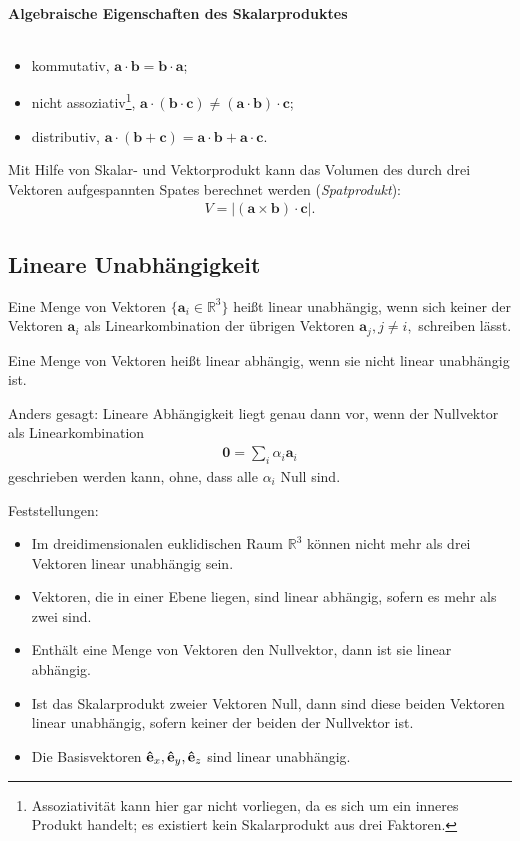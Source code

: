 \paragraph{Algebraische Eigenschaften des Skalarproduktes}$~$

\begin{itemize}
    \item kommutativ, $\bm{a}\cdot \bm{b} = \bm{b}\cdot\bm{a}$; 
    \item nicht assoziativ\footnote{Assoziativität kann hier gar nicht vorliegen, da es sich um ein inneres Produkt handelt; es existiert kein Skalarprodukt aus drei Faktoren.}, $\bm{a}\cdot (\bm{b}\cdot\bm{c}) \neq (\bm{a}\cdot\bm{b})\cdot\bm{c}$;
    \item distributiv, $\bm{a}\cdot (\bm{b}+\bm{c}) = \bm{a}\cdot\bm{b}+\bm{a}\cdot\bm{c}$.
\end{itemize}
Mit Hilfe von Skalar- und Vektorprodukt kann das Volumen des durch drei Vektoren aufgespannten Spates berechnet werden (\emph{Spatprodukt}): 
\begin{align}
    V = |(\bm{a}\times\bm{b}) \cdot\bm{c}|.
\end{align}

\subsection{Lineare Unabhängigkeit}
Eine Menge von Vektoren $\{\bm{a}_i \in \mathbb{R}^3\}$ heißt linear unabhängig, wenn sich keiner der Vektoren $\bm{a}_i$ als Linearkombination der übrigen Vektoren $\bm{a}_j, j \neq i,$ schreiben lässt. 

Eine Menge von Vektoren heißt linear abhängig, wenn sie nicht linear unabhängig ist. 

Anders gesagt: Lineare Abhängigkeit liegt genau dann vor, wenn der Nullvektor als Linearkombination 
\begin{align}
    \bm{0} = \sum_i \alpha_i \bm{a}_i
\end{align}
geschrieben werden kann, ohne, dass alle $\alpha_i$ Null sind.

Feststellungen: 
\begin{itemize}
    \item Im dreidimensionalen euklidischen Raum $\mathbb{R}^3$ können nicht mehr als drei Vektoren linear unabhängig sein. 
    \item Vektoren, die in einer Ebene liegen, sind linear abhängig, sofern es mehr als zwei sind. 
    \item Enthält eine Menge von Vektoren den Nullvektor, dann ist sie linear abhängig. 
    \item Ist das Skalarprodukt zweier Vektoren Null, dann sind diese beiden Vektoren linear unabhängig, sofern keiner der beiden der Nullvektor ist. 
    \item Die Basisvektoren $\vu{e}_x, \vu{e}_y, \vu{e}_z$ sind linear unabhängig.
\end{itemize}

